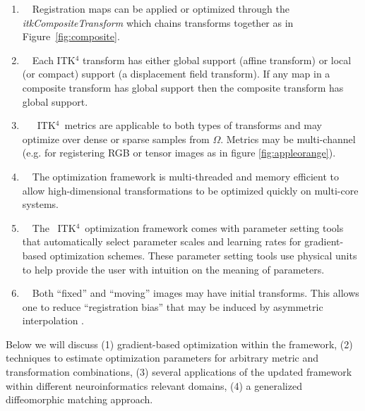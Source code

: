 \documentclass{frontiersSCNS}
\newcommand{\tk}{~ITK$^{\text{4}}$~}
\begin{document}
\begin{enumerate}
\item~~Registration maps can be applied or optimized through the {\em
    itkCompositeTransform} which chains transforms together as in Figure~\ref{fig:composite}.
\item~~Each ITK$^4$ transform has either global support (affine
  transform) or local (or compact) support (a displacement field transform).   If
  any map in a composite transform has global support then the
  composite transform has global support. 
\item~~\tk metrics are applicable to both types of transforms and may
  optimize over dense or sparse samples from $\Omega$.  Metrics may be
  multi-channel (e.g. for registering RGB or tensor images as in
  figure \ref{fig:appleorange}).
\item~~The optimization framework is multi-threaded and memory
  efficient to allow high-dimensional transformations to be optimized
  quickly on multi-core systems.
\item~~The \tk optimization framework comes with parameter setting tools
  that automatically select parameter scales and learning rates for
  gradient-based optimization schemes.  These parameter setting tools
  use physical units to help provide the user with intuition on the
  meaning of parameters.  
\item~~Both ``fixed'' and ``moving'' images may have initial
  transforms.  This allows one to reduce ``registration bias'' that
  may be induced by asymmetric interpolation \cite{Yushkevich2010a}. 
\end{enumerate}
Below we will discuss (1) gradient-based optimization within the
framework, (2) techniques to estimate optimization parameters for
arbitrary metric and transformation combinations, (3) several
applications of the updated framework within different
neuroinformatics relevant domains, (4) a generalized diffeomorphic
matching approach.
\end{document}

